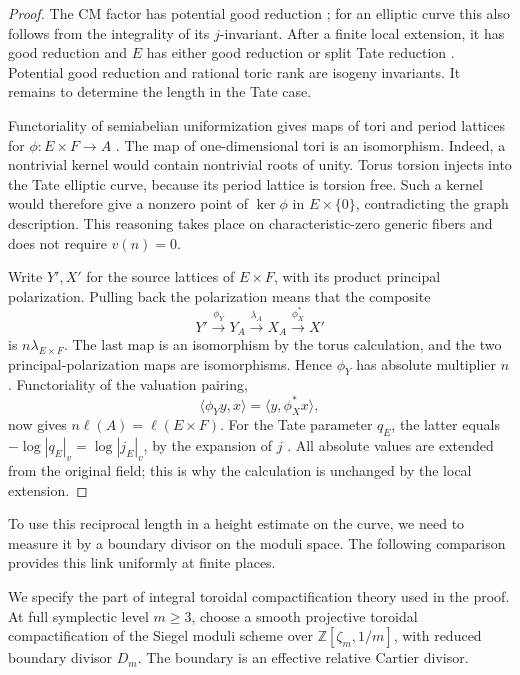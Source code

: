 \documentclass[11pt,a4paper]{article}
\numberwithin{equation}{section}
\theoremstyle{definition}
\theoremstyle{remark}
\newcommand{\Z}{\mathbb Z}
\begin{document}
\begin{proof}
The CM factor has potential good reduction
\cite[Theorem~6(a)]{ST}; for an elliptic curve this also follows from
the integrality of its \(j\)-invariant. After a finite local extension,
it has good reduction and \(E\) has either good reduction or split
Tate reduction \cite[Theorem~1 and Applications]{Tate}.
Potential good reduction and rational toric rank are isogeny
invariants. It remains to determine the length in the Tate case.

Functoriality of semiabelian uniformization gives maps of tori and
period lattices for \(\phi:E\times F\to A\)
\cite[Corollary~4.5.5.5]{Lan}. The map of one-dimensional tori is an
isomorphism. Indeed, a nontrivial kernel would contain nontrivial
roots of unity. Torus torsion injects into the Tate elliptic curve,
because its period lattice is torsion free. Such a kernel would
therefore give a nonzero point of \(\ker\phi\) in \(E\times\{0\}\),
contradicting the graph description.
This reasoning takes place on characteristic-zero generic fibers
and does not require \(v(n)=0\).

Write \(Y',X'\) for the source lattices of \(E\times F\), with
its product principal polarization. Pulling back the polarization
means that the composite
\[
 Y'\xrightarrow{\phi_Y}Y_A\xrightarrow{\lambda_A}X_A
       \xrightarrow{\phi_X^*}X'
\]
is \(n\lambda_{E\times F}\).
The last map is an isomorphism by the torus calculation, and the two
principal-polarization maps are isomorphisms. Hence \(\phi_Y\) has
absolute multiplier \(n\). Functoriality of the valuation pairing,
\[
 \langle\phi_Yy,x\rangle=\langle y,\phi_X^*x\rangle,
\]
now gives \(n\ell(A)=\ell(E\times F)\).
For the Tate parameter \(q_E\), the latter equals
\(-\log|q_E|_v=\log|j_E|_v\), by the expansion of \(j\)
\cite[Equation~(18)]{Tate}.
All absolute values are extended from the original field; this is
why the calculation is unchanged by the local extension.
\end{proof}

To use this reciprocal length in a height estimate on the curve,
we need to measure it by a boundary divisor on the moduli space.
The following comparison provides this link uniformly at finite places.

We specify the part of integral toroidal compactification theory used
in the proof. At full symplectic level \(m\ge3\), choose a smooth
projective toroidal compactification of the Siegel moduli scheme over
\(\Z[\zeta_m,1/m]\), with reduced boundary divisor \(D_m\).
The boundary is an effective relative Cartier divisor.
\end{document}
